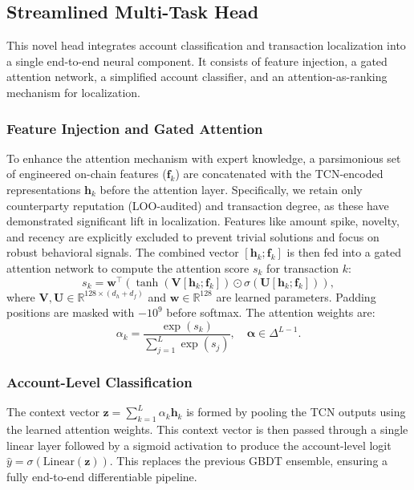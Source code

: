 \documentclass[conference]{IEEEtran}
\begin{document}
\subsection{Streamlined Multi-Task Head}
This novel head integrates account classification and transaction localization into a single end-to-end neural component. It consists of feature injection, a gated attention network, a simplified account classifier, and an attention-as-ranking mechanism for localization.

\subsubsection{Feature Injection and Gated Attention}
To enhance the attention mechanism with expert knowledge, a parsimonious set of engineered on-chain features ($\mathbf{f}_k$) are concatenated with the TCN-encoded representations $\mathbf{h}_k$ before the attention layer. Specifically, we retain only counterparty reputation (LOO-audited) and transaction degree, as these have demonstrated significant lift in localization. Features like amount spike, novelty, and recency are explicitly excluded to prevent trivial solutions and focus on robust behavioral signals. The combined vector $[\mathbf{h}_k; \mathbf{f}_k]$ is then fed into a gated attention network \cite{ilse2018} to compute the attention score $s_k$ for transaction $k$:
\begin{equation}
s_k = \mathbf{w}^\top \left( \tanh(\mathbf{V} [\mathbf{h}_k; \mathbf{f}_k]) \odot \sigma(\mathbf{U} [\mathbf{h}_k; \mathbf{f}_k]) \right),
\end{equation}
where $\mathbf{V}, \mathbf{U} \in \mathbb{R}^{128 \times (d_h + d_f)}$ and $\mathbf{w} \in \mathbb{R}^{128}$ are learned parameters. Padding positions are masked with $-10^9$ before softmax. The attention weights are:
\begin{equation}
\alpha_k = \frac{\exp(s_k)}{\sum_{j=1}^L \exp(s_j)}, \quad \boldsymbol{\alpha} \in \Delta^{L-1}.
\end{equation}

\subsubsection{Account-Level Classification}
The context vector $\mathbf{z} = \sum_{k=1}^L \alpha_k \mathbf{h}_k$ is formed by pooling the TCN outputs using the learned attention weights. This context vector is then passed through a single linear layer followed by a sigmoid activation to produce the account-level logit $\hat{y} = \sigma(\text{Linear}(\mathbf{z}))$. This replaces the previous GBDT ensemble, ensuring a fully end-to-end differentiable pipeline.
\end{document}
